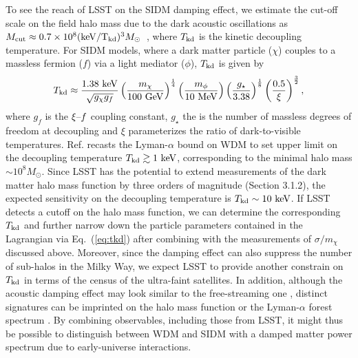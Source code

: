 To see the reach of LSST on the SIDM damping effect, we estimate the cut-off scale on the field halo mass due to the dark acoustic oscillations as $M_{\rm cut}\approx0.7\times10^{8}({\rm keV/T_{\rm kd}})^3M_\odot$~\citep{1512.05349}, where $T_{\rm kd}$ is the kinetic decoupling temperature. For SIDM models, where a dark matter particle ($\chi$) couples to a massless fermion ($f$) via a light mediator ($\phi$), $T_{\rm kd}$ is given by~\citep{Aarssen:2012fx,Cyr-Racine:2015ihg}
\begin{equation}
T_{\rm kd}\approx\frac{1.38~{\rm keV}}{\sqrt{g_\chi g_f}}\left(\frac{m_\chi}{100~{\rm GeV}}\right)^{\frac{1}{4}}\left(\frac{m_\phi}{10~{\rm MeV}}\right)\left(\frac{g_\star}{3.38}\right)^{\frac{1}{8}}\left(\frac{0.5}{\xi}\right)^{\frac{3}{2}},
\label{eq:tkd}
\end{equation}
where $g_f$ is the $\xi\textup{--}f$ coupling constant, $g_\star$ the is the number of massless degrees of freedom at decoupling and $\xi$ parameterizes the ratio of dark-to-visible temperatures. Ref. \cite{Huo:2017vef} recasts the Lyman-$\alpha$ bound on WDM to set upper limit on the decoupling temperature $T_{\rm kd}\gtrsim 1~{\rm keV}$, corresponding to the minimal halo mass $\sim10^8 M_\odot$. Since LSST has the potential to extend measurements of the dark matter halo mass function by three orders of magnitude (Section 3.1.2), the expected sensitivity on the decoupling temperature is $T_{\rm kd}\sim 10~{\rm keV}$. If LSST detects a cutoff on the halo mass function, we can determine the corresponding $T_{\rm kd}$ and further narrow down the particle parameters contained in the Lagrangian via Eq.~(\ref{eq:tkd}) after combining with the measurements of $\sigma/m_\chi$ discussed above. Moreover, since the damping effect can also suppress the number of sub-halos in the Milky Way, we expect LSST to provide another constrain on $T_{\rm kd}$ in terms of the census of the ultra-faint satellites. In addition, although the acoustic damping effect may look similar to the free-streaming one \citep[\eg][]{1512.05349}, distinct signatures can be imprinted on the halo mass function \citep{Buckley:2014ab,Sameie:2018juk} or the Lyman-$\alpha$ forest spectrum \citep{Krall:2017xcw,Bose:2018juc}. By combining observables, including those from LSST, it might thus be possible to distinguish between WDM and SIDM with a damped matter power spectrum due to early-universe interactions.


